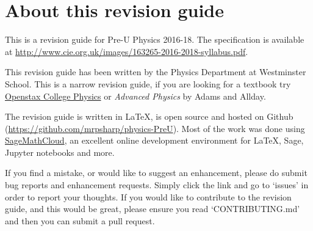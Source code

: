 \documentclass[main.tex]{subfiles}
\begin{document}
\chapter{About this revision guide}

This is a revision guide for Pre-U Physics 2016-18. The specification is available at \url{http://www.cie.org.uk/images/163265-2016-2018-syllabus.pdf}.

This revision guide has been written by the Physics Department at Westminster School. This is a narrow revision guide, if you are looking for a textbook try \href{https://openstax.org/details/books/college-physics}{Openstax College Physics} or \emph{Advanced Physics} by Adams and Allday.

The revision guide is written in \LaTeX, is open source and hosted on Github (\url{https://github.com/mrpsharp/physics-PreU}). Most of the work was done using \href{https://cloud.sagemath.com}{SageMathCloud}, an excellent online development environment for \LaTeX, Sage, Jupyter notebooks and more.


If you find a mistake, or would like to suggest an enhancement, please do submit bug reports and enhancement requests. Simply click the link and go to `issues' in order to report your thoughts. If you would like to contribute to the revision guide, and this would be great, please ensure you read `CONTRIBUTING.md' and then you can submit a pull request.
\end{document}
